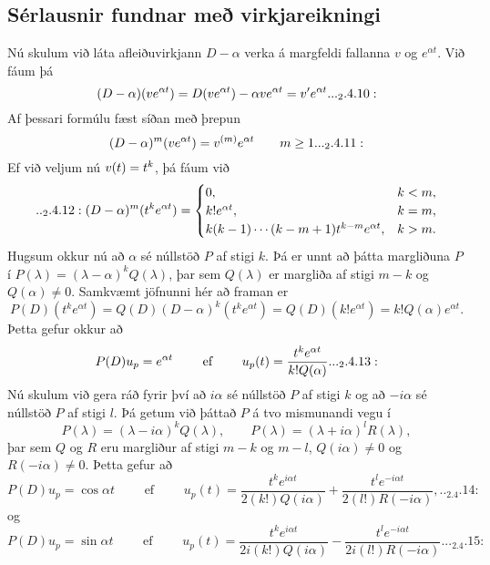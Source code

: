 \subsection*{Sérlausnir fundnar með virkjareikningi}

Nú skulum við láta afleiðuvirkjann $D-{\alpha}$ verka á margfeldi
fallanna $v$ og $e^{{\alpha} t}$.  Við fáum þá 
 \begin{equation*}(D-\alpha)(ve\sp{\alpha t})
=D(ve\sp{\alpha t})-\alpha ve\sp{\alpha t} = v\dash e\sp{\alpha t}.


.. _2.4.10:

 \end{equation*}
Af þessari formúlu fæst síðan með þrepun
 \begin{equation*}(D-\alpha)\sp m(ve\sp{\alpha t})= v\sp{(m)} e\sp{\alpha
t}\qquad m\geq 1.

.. _2.4.11:

 \end{equation*}
Ef við veljum nú $v(t)=t\sp k$, þá fáum við 
 \begin{equation*}

.. _2.4.12:
(D-\alpha)\sp m(t\sp ke\sp{\alpha t})= 
\begin{cases}
0, &k<m,\\
k!e^{\alpha t},& k=m,\\
k(k-1)\cdots(k-m+1)t^{k-m}e^{\alpha t},& k>m.
\end{cases}
 \end{equation*}
Hugsum okkur nú að $\alpha$ sé núllstöð $P$ af stigi $k$.  Þá er
unnt að þátta margliðuna $P$ í
$P(\lambda)=(\lambda-\alpha)^kQ(\lambda)$, þar sem $Q(\lambda)$ er
margliða af stigi $m-k$ og $Q(\alpha)\neq 0$.  Samkvæmt jöfnunni hér
að framan  er
$$
P(D)(t^ke^{\alpha t}) = Q(D)(D-\alpha)^k(t^ke^{\alpha t})=
Q(D)(k!e^{\alpha t})=k!Q(\alpha)e^{\alpha t}.
$$
Þetta gefur okkur að
\begin{equation*}
P(D)u_p=e\sp{\alpha t} \qquad \text{ ef } \qquad
u_p(t) = \dfrac{t^ke^{\alpha t}}{k!Q(\alpha)}.


.. _2.4.13:

\end{equation*}
Nú skulum við gera ráð fyrir því að
$i\alpha$ sé núllstöð $P$ af stigi $k$ og að $-i\alpha$ sé núllstöð
$P$ af stigi $l$.  Þá getum við þáttað $P$ á tvo mismunandi vegu í
$$
P(\lambda)= (\lambda-i\alpha)^kQ(\lambda), \qquad
P(\lambda)= (\lambda+i\alpha)^lR(\lambda),
$$
þar sem $Q$ og $R$ eru margliður af stigi $m-k$ og $m-l$, 
$Q(i\alpha)\neq 0$ og $R(-i\alpha)\neq 0$.   Þetta gefur að
 \begin{equation*}
P(D)u_p=\cos \alpha t \qquad\text{ ef } \qquad
u_p(t)=\dfrac{t^ke^{i\alpha t}}{2(k!)Q(i\alpha)}+
\dfrac{t^le^{-i\alpha t}}{2(l!)R(-i\alpha)},


.. _2.4.14:

 \end{equation*}
og
 \begin{equation*}
P(D)u_p=\sin \alpha t \qquad \text{ ef } \qquad
u_p(t)=\dfrac{t^ke^{i\alpha t}}{2i(k!)Q(i\alpha)}-
\dfrac{t^le^{-i\alpha t}}{2i(l!)R(-i\alpha)}.


.. _2.4.15:

 \end{equation*}

